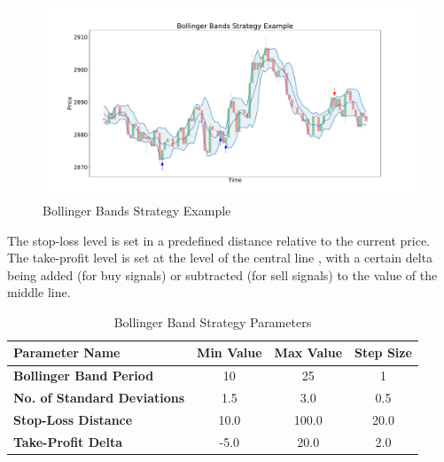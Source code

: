 \begin{figure}[H]
    \centering
    \includegraphics[width=\textwidth]{images/trading-strategies/bb-example}
    \caption{Bollinger Bands Strategy Example}
    \label{fig:bb-example}
\end{figure}

\noindent
The stop-loss level is set in a predefined distance relative to the current price.
The take-profit level is set at the level of the central line , with a certain delta being added (for buy signals) or subtracted (for sell signals) to the value of the middle line.

\begin{table}[H]
    \centering
    \begin{tabular}{L{4cm}ccc}
        \toprule
        \textbf{Parameter Name} & Min Value & Max Value & Step Size
        \\
        \midrule
        \textbf{Bollinger Band Period}      & 10   & 25    & 1    \\
        \textbf{No. of Standard Deviations} & 1.5  & 3.0   & 0.5  \\
        \textbf{Stop-Loss Distance}         & 10.0 & 100.0 & 20.0 \\
        \textbf{Take-Profit Delta}          & -5.0 & 20.0  & 2.0  \\
        \bottomrule
    \end{tabular}
    \caption{Bollinger Band Strategy Parameters}
    \label{tbl:bb-strategy-parameters}
\end{table}
